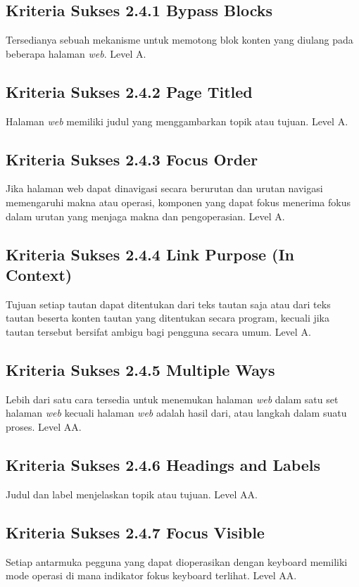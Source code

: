 \subsection{Kriteria Sukses 2.4.1 Bypass Blocks}
\label{sec:kriteria_2.4.1}
Tersedianya sebuah mekanisme untuk memotong blok konten yang diulang pada beberapa halaman \textit{web}.
Level A.

\subsection{Kriteria Sukses 2.4.2 Page Titled}
\label{sec:kriteria_2.4.2}
Halaman \textit{web} memiliki judul yang menggambarkan topik atau tujuan.
Level A.

\subsection{Kriteria Sukses 2.4.3 Focus Order}
\label{sec:kriteria_2.4.3}
Jika halaman web dapat dinavigasi secara berurutan dan urutan navigasi memengaruhi makna atau operasi, komponen yang dapat fokus menerima fokus dalam urutan yang menjaga makna dan pengoperasian.
Level A.

\subsection{Kriteria Sukses 2.4.4 Link Purpose (In Context)}
\label{sec:kriteria_2.4.4}
Tujuan setiap tautan dapat ditentukan dari teks tautan saja atau dari teks tautan beserta konten tautan yang ditentukan secara program, kecuali jika tautan tersebut bersifat ambigu bagi pengguna secara umum.
Level A.

\subsection{Kriteria Sukses 2.4.5 Multiple Ways}
\label{sec:kriteria_2.4.5}
Lebih dari satu cara tersedia untuk menemukan halaman \textit{web} dalam satu set halaman \textit{web} kecuali halaman \textit{web} adalah hasil dari, atau langkah dalam suatu proses.
Level AA.

\subsection{Kriteria Sukses 2.4.6 Headings and Labels}
\label{sec:kriteria_2.4.6}
Judul dan label menjelaskan topik atau tujuan.
Level AA.

\subsection{Kriteria Sukses 2.4.7 Focus Visible}
\label{sec:kriteria_2.4.7}
Setiap antarmuka pegguna yang dapat dioperasikan dengan keyboard memiliki mode operasi di mana indikator fokus keyboard terlihat.
Level AA.

